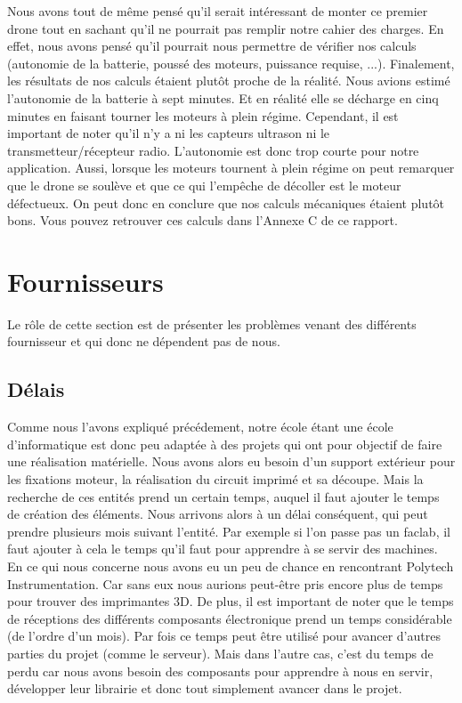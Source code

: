 \documentclass[a4paper,10pt]{report}
\begin{document}
	Nous avons tout de même pensé qu'il serait intéressant de monter ce 
premier drone tout en sachant qu'il ne pourrait pas remplir notre cahier des 
charges. En effet, nous avons pensé qu'il pourrait nous permettre de vérifier 
nos calculs (autonomie de la batterie, poussé des moteurs, puissance requise, 
...). Finalement, les résultats de nos calculs étaient plutôt proche de la 
réalité. Nous avions estimé l'autonomie de la batterie à sept minutes. Et en 
réalité elle se décharge en cinq minutes en faisant tourner les moteurs à plein 
régime. Cependant, il est important de noter qu'il n'y a ni les capteurs 
ultrason ni le transmetteur/récepteur radio. L'autonomie est donc trop courte 
pour notre application. Aussi, lorsque les moteurs tournent à plein régime on 
peut remarquer que le drone se soulève et que ce qui l'empêche de décoller est 
le moteur défectueux. On peut donc en conclure que nos calculs mécaniques 
étaient plutôt bons. Vous pouvez retrouver ces calculs dans l'Annexe C de ce 
rapport.
    
    \section{Fournisseurs}
      Le rôle de cette section est de présenter les problèmes venant des 
différents fournisseur et qui donc ne dépendent pas de nous.
      \subsection{Délais}
	Comme nous l'avons expliqué précédement, notre école étant une école 
d'informatique est donc peu adaptée à des projets qui ont pour objectif de 
faire une réalisation matérielle. Nous avons alors eu besoin d'un support 
extérieur pour les fixations moteur, la réalisation du circuit imprimé et sa 
découpe. Mais la recherche de ces entités prend un certain temps, auquel il 
faut ajouter le temps de création des éléments. Nous arrivons alors à un délai 
conséquent, qui peut prendre plusieurs mois suivant l'entité. Par exemple si 
l'on passe pas un faclab, il faut ajouter à cela le temps qu'il faut pour 
apprendre à se servir des machines. En ce qui nous concerne nous avons eu un 
peu de chance en rencontrant Polytech Instrumentation. Car sans eux nous 
aurions peut-être pris encore plus de temps pour trouver des imprimantes 3D. 
De plus, il est important de noter que le temps de réceptions des différents 
composants électronique prend un temps considérable (de l'ordre d'un mois). Par 
fois ce temps peut être utilisé pour avancer d'autres parties du projet (comme 
le serveur). Mais dans l'autre cas, c'est du temps de perdu car nous avons 
besoin des composants pour apprendre à nous en servir, développer leur 
librairie et donc tout simplement avancer dans le projet.
\end{document}
